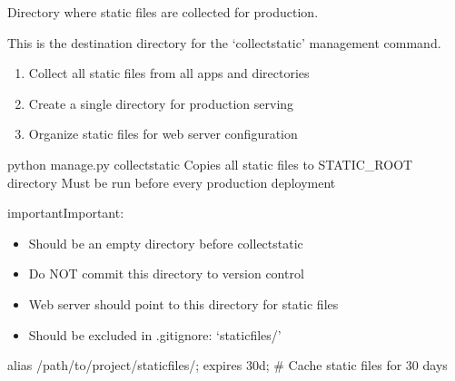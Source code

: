 \documentclass[letterpaper,10pt,english]{sphinxmanual}
\begin{document}
\begin{fulllineitems}
\label{\detokenize{softwareProject:softwareProject.settings.STATIC_ROOT}}
\pysigstartsignatures
\pysigline
{}
\pysigstopsignatures
\sphinxAtStartPar
Directory where static files are collected for production.

\sphinxAtStartPar
This is the destination directory for the ‘collectstatic’ management command.
\begin{description}
\begin{enumerate}
%
\item {} 
\sphinxAtStartPar
Collect all static files from all apps and directories

\item {} 
\sphinxAtStartPar
Create a single directory for production serving

\item {} 
\sphinxAtStartPar
Organize static files for web server configuration

\end{enumerate}

\sphinxAtStartPar
python manage.py collectstatic
\sphinxhyphen{} Copies all static files to STATIC\_ROOT directory
\sphinxhyphen{} Must be run before every production deployment

\end{description}

\begin{sphinxadmonition}{important}{Important:}\begin{itemize}
\item {} 
\sphinxAtStartPar
Should be an empty directory before collectstatic

\item {} 
\sphinxAtStartPar
Do NOT commit this directory to version control

\item {} 
\sphinxAtStartPar
Web server should point to this directory for static files

\item {} 
\sphinxAtStartPar
Should be excluded in .gitignore: ‘staticfiles/’

\end{itemize}
\end{sphinxadmonition}
\begin{description}
\begin{description}
\sphinxAtStartPar
alias /path/to/project/staticfiles/;
expires 30d;  \# Cache static files for 30 days


\end{description}
\end{description}
\end{fulllineitems}
\end{document}
